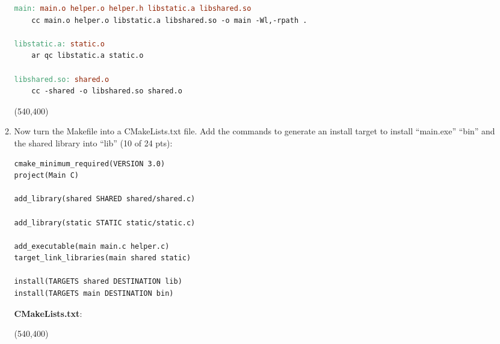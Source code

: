 \documentclass[10pt]{article}
\begin{document}
\begin{enumerate}
\begin{enumerate}
\begin{lstlisting}[language=make]
main: main.o helper.o helper.h libstatic.a libshared.so
	cc main.o helper.o libstatic.a libshared.so -o main -Wl,-rpath .

libstatic.a: static.o
	ar qc libstatic.a static.o

libshared.so: shared.o
	cc -shared -o libshared.so shared.o
\end{lstlisting}
\else
\hspace*{-0.4in}\framebox(540,400){}
\fi
\newpage
	\item Now turn the Makefile into a CMakeLists.txt file. Add the commands to generate an install target to install ``main.exe''  ``bin'' and the shared library into ``lib'' (10 of 24 pts):

\beginanswers
\begin{lstlisting}[language=make]
cmake_minimum_required(VERSION 3.0)
project(Main C)

add_library(shared SHARED shared/shared.c)

add_library(static STATIC static/static.c)

add_executable(main main.c helper.c)
target_link_libraries(main shared static)

install(TARGETS shared DESTINATION lib)
install(TARGETS main DESTINATION bin)
\end{lstlisting}
\else

\textbf{CMakeLists.txt}:

\hspace*{-0.4in}\framebox(540,400){}

\fi
\end{enumerate}
	
\end{enumerate}
\end{document}
